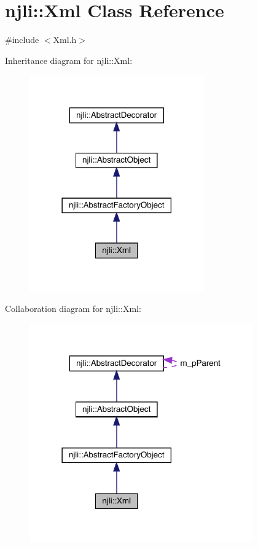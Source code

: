 \hypertarget{classnjli_1_1_xml}{}\section{njli\+:\+:Xml Class Reference}
\label{classnjli_1_1_xml}


{\ttfamily \#include $<$Xml.\+h$>$}



Inheritance diagram for njli\+:\+:Xml\+:\nopagebreak
\begin{figure}[H]
\begin{center}
\leavevmode
\includegraphics[width=213pt]{classnjli_1_1_xml__inherit__graph}
\end{center}
\end{figure}


Collaboration diagram for njli\+:\+:Xml\+:\nopagebreak
\begin{figure}[H]
\begin{center}
\leavevmode
\includegraphics[width=273pt]{classnjli_1_1_xml__coll__graph}
\end{center}
\end{figure}
